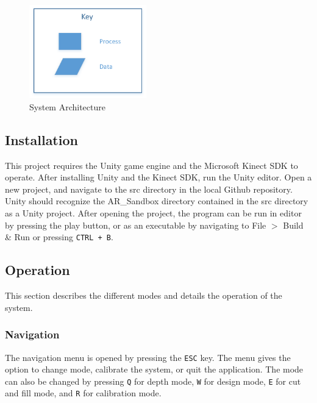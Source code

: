 \documentclass[onecolumn, draftclsnofoot,10pt, compsoc]{IEEEtran}
\begin{document}
\begin{figure}[H]
	\centering
	\includegraphics[width=2in]{SysArchKey}
    \caption{System Architecture}
\end{figure}

\subsection{Installation}
This project requires the Unity game engine and the Microsoft Kinect SDK to operate. After installing Unity and the Kinect SDK, run the Unity editor. Open a new project, and navigate to the src directory in the local Github repository. Unity should recognize the AR\_Sandbox directory contained in the src directory as a Unity project. After opening the project, the program can be run in editor by pressing the play button, or as an executable by navigating to File $>$ Build \& Run or pressing \texttt{CTRL + B}.
\subsection{Operation}
This section describes the different modes and details the operation of the system.
\subsubsection{Navigation}
The navigation menu is opened by pressing the \texttt{ESC} key. The menu gives the option to change mode, calibrate the system, or quit the application. The mode can also be changed by pressing \texttt{Q} for depth mode, \texttt{W} for design mode, \texttt{E} for cut and fill mode, and \texttt{R} for calibration mode.
\end{document}
